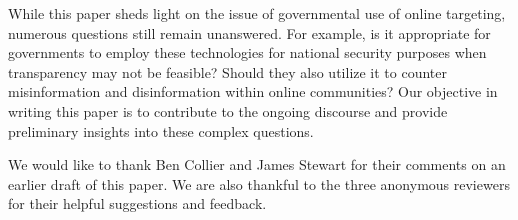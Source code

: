 \documentclass[preprint]{acmart}
\begin{document}
While this paper sheds light on the issue of governmental use of online targeting, numerous questions still remain unanswered. For example, is it appropriate for governments to employ these technologies for national security purposes when transparency may not be feasible? Should they also utilize it to counter misinformation and disinformation within online communities? Our objective in writing this paper is to contribute to the ongoing discourse and provide preliminary insights into these complex questions.


\begin{acks}
We would like to thank Ben Collier and James Stewart for their comments on an earlier draft of this paper. We are also thankful to the three anonymous reviewers for their helpful suggestions and feedback.
\end{acks}




\end{document}

